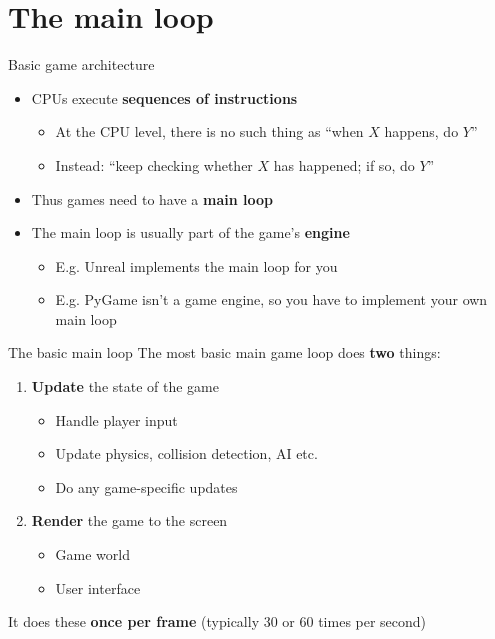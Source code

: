 \part{The main loop}
\frame{\partpage}

\begin{frame}{Basic game architecture}
    \begin{itemize}
        \pause\item CPUs execute \textbf{sequences of instructions} 
            \begin{itemize}
                \pause\item At the CPU level, there is no such thing as ``when $X$ happens, do $Y$'' 
                \pause\item Instead: ``keep checking whether $X$ has happened; if so, do $Y$'' 
            \end{itemize}
        \pause\item Thus games need to have a \textbf{main loop} 
        \pause\item The main loop is usually part of the game's \textbf{engine} 
            \begin{itemize}
                \pause\item E.g. Unreal implements the main loop for you 
                \pause\item E.g. PyGame isn't a game engine, so you have to implement your own main loop
            \end{itemize}
    \end{itemize}
\end{frame}

\begin{frame}{The basic main loop}
    \pause The most basic main game loop does \textbf{two} things: 
    \begin{enumerate}
        \pause\item \textbf{Update} the state of the game 
            \begin{itemize}
            	\pause\item Handle player input
                \pause\item Update physics, collision detection, AI etc. 
                \pause\item Do any game-specific updates 
            \end{itemize}
        \pause\item \textbf{Render} the game to the screen
            \begin{itemize}
            	\pause\item Game world 
                \pause\item User interface
            \end{itemize}
    \end{enumerate}
    \pause It does these \textbf{once per frame} (typically 30 or 60 times per second)
\end{frame}

